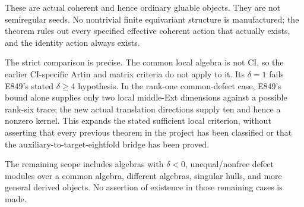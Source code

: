 These are actual coherent and hence ordinary gluable objects. They
are not semiregular seeds. No nontrivial finite equivariant structure
is manufactured; the theorem rules out every specified effective
coherent action that actually exists, and the identity action always
exists.

The strict comparison is precise. The common local algebra is not CI,
so the earlier CI-specific Artin and matrix criteria do not apply to
it. Its \(\delta=1\) fails E849's stated \(\delta\ge4\) hypothesis. In the
rank-one common-defect case, E849's bound alone supplies only two
local middle-Ext dimensions against a possible rank-six trace; the
new actual translation directions supply ten and hence a nonzero
kernel. This expands the stated sufficient local criterion, without
asserting that every previous theorem in the project has been classified
or that the auxiliary-to-target-eightfold bridge has been proved.

The remaining scope includes algebras with \(\delta<0\), unequal/nonfree
defect modules over a common algebra, different algebras, singular hulls,
and more general derived objects. No assertion of existence in those
remaining cases is made.
